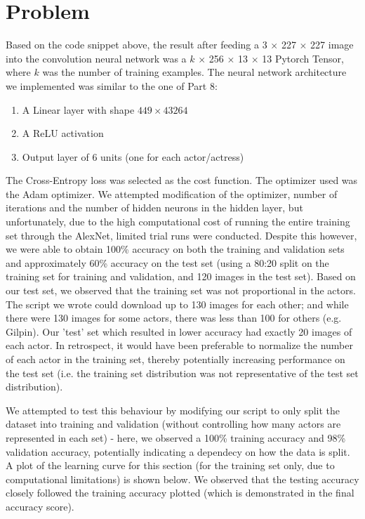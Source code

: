 \documentclass{article}
\newcommand{\enterProblemHeader}[1]{
}
\newcommand{\exitProblemHeader}[1]{
}
\newcounter{homeworkProblemCounter} %
\newcommand{\homeworkProblemName}{}
\newenvironment{homeworkProblem}[1][Problem \arabic{homeworkProblemCounter}]{ %
\stepcounter{homeworkProblemCounter} %
\renewcommand{\homeworkProblemName}{#1} %
\section{\homeworkProblemName} %
\enterProblemHeader{\homeworkProblemName} %
}{
\exitProblemHeader{\homeworkProblemName} %
}
\begin{document}
\begin{homeworkProblem}
Based on the code snippet above, the result after feeding a 3 $\times$ 227 $\times$ 227 image into the convolution neural network was a $k$ $\times$ 256 $\times$ 13 $\times$ 13 Pytorch Tensor, where $k$ was the number of training examples.  The neural network architecture we implemented was similar to the one of Part 8:
\begin{enumerate}
\item A Linear layer with shape $449 \times 43264$
\item A ReLU activation
\item Output layer of 6 units (one for each actor/actress)
\end{enumerate}
The Cross-Entropy loss was selected as the cost function.  The optimizer used was the Adam optimizer.  We attempted modification of the optimizer, number of iterations and the number of hidden neurons in the hidden layer, but unfortunately, due to the high computational cost of running the entire training set through the AlexNet, limited trial runs were conducted.  Despite this however, we were able to obtain 100\% accuracy on both the training and validation sets and approximately 60\% accuracy on the test set (using a 80:20 split on the training set for training and validation, and 120 images in the test set).  Based on our test set, we observed that the training set was not proportional in the actors.  The script we wrote could download up to 130 images for each other; and while there were 130 images for some actors, there was less than 100 for others (e.g. Gilpin). Our 'test' set which resulted in lower accuracy had exactly 20 images of each actor. In retrospect, it would have been preferable to normalize the number of each actor in the training set, thereby potentially increasing performance on the test set (i.e. the training set distribution was not representative of the test set distribution).
\par
We attempted to test this behaviour by modifying our script to only split the dataset into training and validation (without controlling how many actors are represented in each set) - here, we observed a 100\% training accuracy and 98\% validation accuracy, potentially indicating a dependecy on how the data is split. A plot of the learning curve for this section (for the training set only, due to computational limitations) is shown below.  We observed that the testing accuracy closely followed the training accuracy plotted (which is demonstrated in the final accuracy score).
\clearpage
\begin{center}

\end{center}
\end{homeworkProblem}
\end{document}
